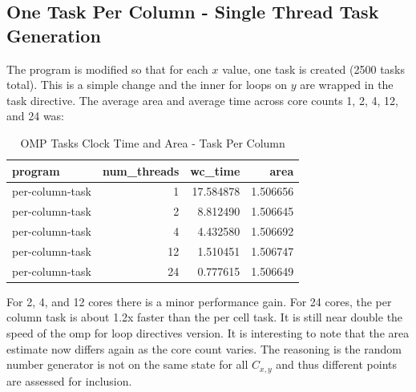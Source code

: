 \documentclass{article}
\begin{document}
\subsection{One Task Per Column - Single Thread Task Generation}
The program is modified so that for each $x$ value, one task is created (2500 tasks total). This is a simple change 
and the inner for loops on $y$ are wrapped in the task directive. The average area and average time across core counts 1, 2, 4, 12, and 24 was:
\begin{table}[H]
    \centering
    \caption{OMP Tasks Clock Time and Area - Task Per Column}
    \fontsize{12}{14}\selectfont
    \begin{tabular}[t]{l|r|r|r}
    \hline
    program & num\_threads & wc\_time & area\\
    \hline
    per-column-task & 1 & 17.584878 & 1.506656\\
    \hline
    per-column-task & 2 & 8.812490 & 1.506645\\
    \hline
    per-column-task & 4 & 4.432580 & 1.506692\\
    \hline
    per-column-task & 12 & 1.510451 & 1.506747\\
    \hline
    per-column-task & 24 & 0.777615 & 1.506649\\
    \hline
    \end{tabular}
\end{table}
\noindent For 2, 4, and 12 cores there is a minor performance gain. For 24 cores, the per column 
task is about 1.2x faster than the per cell task. It is still near double the speed of 
the omp for loop directives version. It is interesting to note that the area estimate now 
differs again as the core count varies. The reasoning is the random number generator 
is not on the same state for all $C_{x,y}$ and thus different points are assessed for 
inclusion.
\end{document}
